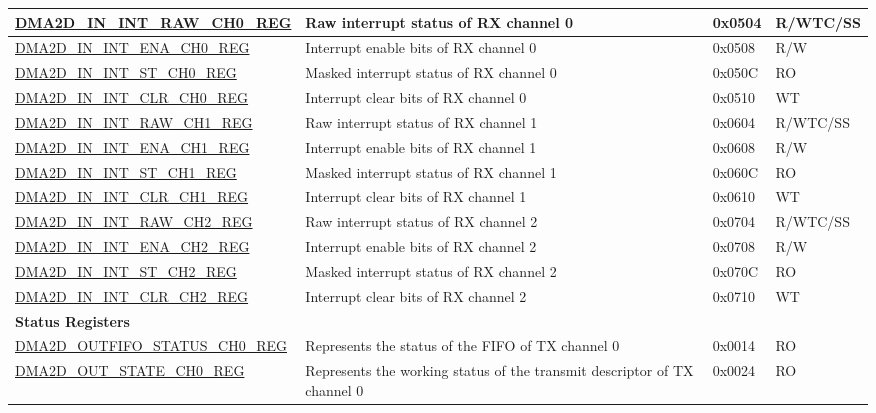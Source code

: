 \begin{longtable}{ | p{7cm} | p{11.5cm} | p{1.3cm} | p{2cm} | }
\hyperref[regdesc:DMA2DININTRAWCHNREG]{DMA2D\_IN\_INT\_RAW\_CH0\_REG} & Raw interrupt status of RX channel 0 & 0x0504 & R/WTC/SS \\ \hline
\hyperref[regdesc:DMA2DININTENACHNREG]{DMA2D\_IN\_INT\_ENA\_CH0\_REG} & Interrupt enable bits of RX channel 0 & 0x0508 & R/W \\ \hline
\hyperref[regdesc:DMA2DININTSTCHNREG]{DMA2D\_IN\_INT\_ST\_CH0\_REG} & Masked interrupt status of RX channel 0 & 0x050C & RO \\ \hline
\hyperref[regdesc:DMA2DININTCLRCHNREG]{DMA2D\_IN\_INT\_CLR\_CH0\_REG} & Interrupt clear bits of RX channel 0 & 0x0510 & WT \\ \hline
\hyperref[regdesc:DMA2DININTRAWCHNREG]{DMA2D\_IN\_INT\_RAW\_CH1\_REG} & Raw interrupt status of RX channel 1 & 0x0604 & R/WTC/SS \\ \hline
\hyperref[regdesc:DMA2DININTENACHNREG]{DMA2D\_IN\_INT\_ENA\_CH1\_REG} & Interrupt enable bits of RX channel 1 & 0x0608 & R/W \\ \hline
\hyperref[regdesc:DMA2DININTSTCHNREG]{DMA2D\_IN\_INT\_ST\_CH1\_REG} & Masked interrupt status of RX channel 1 & 0x060C & RO \\ \hline
\hyperref[regdesc:DMA2DININTCLRCHNREG]{DMA2D\_IN\_INT\_CLR\_CH1\_REG} & Interrupt clear bits of RX channel 1 & 0x0610 & WT \\ \hline
\hyperref[regdesc:DMA2DININTRAWCHNREG]{DMA2D\_IN\_INT\_RAW\_CH2\_REG} & Raw interrupt status of RX channel 2 & 0x0704 & R/WTC/SS \\ \hline
\hyperref[regdesc:DMA2DININTENACHNREG]{DMA2D\_IN\_INT\_ENA\_CH2\_REG} & Interrupt enable bits of RX channel 2 & 0x0708 & R/W \\ \hline
\hyperref[regdesc:DMA2DININTSTCHNREG]{DMA2D\_IN\_INT\_ST\_CH2\_REG} & Masked interrupt status of RX channel 2 & 0x070C & RO \\ \hline
\hyperref[regdesc:DMA2DININTCLRCHNREG]{DMA2D\_IN\_INT\_CLR\_CH2\_REG} & Interrupt clear bits of RX channel 2 & 0x0710 & WT \\ \hline
\multicolumn{4}{|l|}{\textbf{Status Registers}} \\ \hline
\hyperref[regdesc:DMA2DOUTFIFOSTATUSCHNREG]{DMA2D\_OUTFIFO\_STATUS\_CH0\_REG} & Represents the status of the FIFO of TX channel 0 & 0x0014 & RO \\ \hline
\hyperref[regdesc:DMA2DOUTSTATECHNREG]{DMA2D\_OUT\_STATE\_CH0\_REG} & Represents the working status of the transmit descriptor of TX channel 0 & 0x0024 & RO \\ \hline

\end{longtable}
